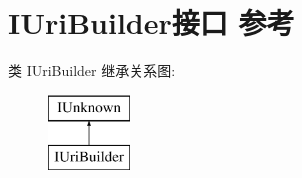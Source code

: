 \hypertarget{interface_i_uri_builder}{}\section{I\+Uri\+Builder接口 参考}
\label{interface_i_uri_builder}
类 I\+Uri\+Builder 继承关系图\+:\begin{figure}[H]
\begin{center}
\leavevmode
\includegraphics[height=2.000000cm]{interface_i_uri_builder}
\end{center}
\end{figure}
